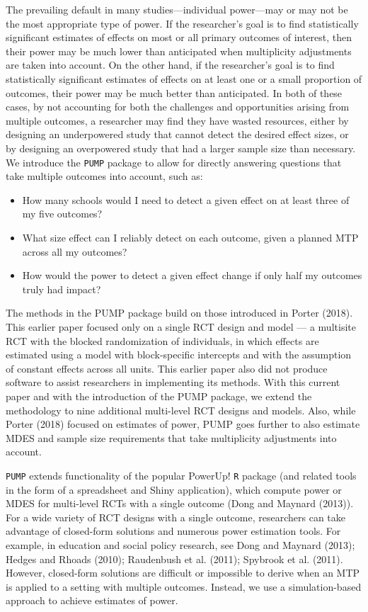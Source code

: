 \documentclass[
]{article}
\providecommand{\tightlist}{%
  \setlength{\itemsep}{0pt}\setlength{\parskip}{0pt}}
\begin{document}
The prevailing default in many studies---individual power---may or may
not be the most appropriate type of power. If the researcher's goal is
to find statistically significant estimates of effects on most or all
primary outcomes of interest, then their power may be much lower than
anticipated when multiplicity adjustments are taken into account. On the
other hand, if the researcher's goal is to find statistically
significant estimates of effects on at least one or a small proportion
of outcomes, their power may be much better than anticipated. In both of
these cases, by not accounting for both the challenges and opportunities
arising from multiple outcomes, a researcher may find they have wasted
resources, either by designing an underpowered study that cannot detect
the desired effect sizes, or by designing an overpowered study that had
a larger sample size than necessary. We introduce the \texttt{PUMP}
package to allow for directly answering questions that take multiple
outcomes into account, such as:

\begin{itemize}
\tightlist
\item
  How many schools would I need to detect a given effect on at least
  three of my five outcomes?
\item
  What size effect can I reliably detect on each outcome, given a
  planned MTP across all my outcomes?
\item
  How would the power to detect a given effect change if only half my
  outcomes truly had impact?
\end{itemize}

The methods in the PUMP package build on those introduced in Porter
(2018). This earlier paper focused only on a single RCT design and model
--- a multisite RCT with the blocked randomization of individuals, in
which effects are estimated using a model with block-specific intercepts
and with the assumption of constant effects across all units. This
earlier paper also did not produce software to assist researchers in
implementing its methods. With this current paper and with the
introduction of the PUMP package, we extend the methodology to nine
additional multi-level RCT designs and models. Also, while Porter (2018)
focused on estimates of power, PUMP goes further to also estimate MDES
and sample size requirements that take multiplicity adjustments into
account.

\texttt{PUMP} extends functionality of the popular PowerUp! \texttt{R}
package (and related tools in the form of a spreadsheet and Shiny
application), which compute power or MDES for multi-level RCTs with a
single outcome (Dong and Maynard (2013)). For a wide variety of RCT
designs with a single outcome, researchers can take advantage of
closed-form solutions and numerous power estimation tools. For example,
in education and social policy research, see Dong and Maynard (2013);
Hedges and Rhoads (2010); Raudenbush et al. (2011); Spybrook et al.
(2011). However, closed-form solutions are difficult or impossible to
derive when an MTP is applied to a setting with multiple outcomes.
Instead, we use a simulation-based approach to achieve estimates of
power.
\end{document}
